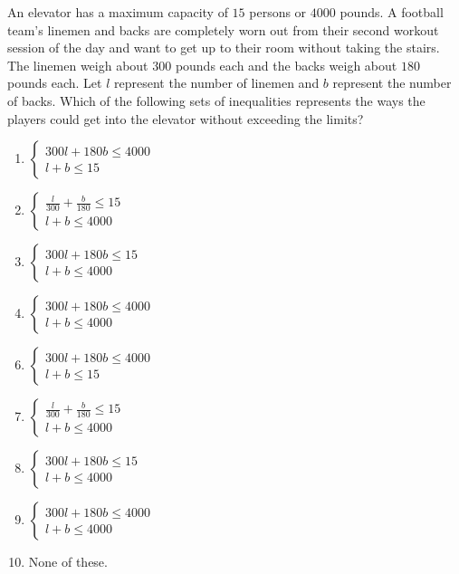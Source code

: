  
An elevator has a maximum capacity of $15$ persons or $4000$ pounds.  A football team's linemen and backs are completely worn out from their second workout session of the day and want to get up to their room without taking the stairs.  The linemen weigh about $300$ pounds each and the backs weigh about $180$ pounds each.  Let $l$ represent the number of linemen and $b$ represent the number of backs.  Which of the following sets of inequalities represents the ways the players could get into the elevator without exceeding the limits?


\ifsat
	\begin{enumerate}[label=\Alph*)]
		\item $\left\lbrace
 \begin{array}{l} 
 300l+180b\leq 4000\\ 
 l+b\leq 15 
 \end{array}
 \right.  $ %
		\item $\left\lbrace
 \begin{array}{l}
 \frac{l}{300}+\frac{b}{180}\leq 15\\
 l+b\leq 4000
 \end{array}\right. $ 
		\item $\left\lbrace
 \begin{array}{l}
 300l+180b\leq 15\\
 l+b\leq 4000
 \end{array}\right. $ 
		\item $\left\lbrace
 \begin{array}{l}
 300l+180b\leq 4000\\
 l+b\leq 4000
 \end{array}\right. $
	\end{enumerate}
\else
\fi

\ifacteven
	\begin{enumerate}[label=\textbf{\Alph*.},itemsep=\fill,align=left]
		\setcounter{enumii}{5}
		\item $\left\lbrace
 \begin{array}{l} 
 300l+180b\leq 4000\\ 
 l+b\leq 15 
 \end{array}
 \right.  $ %
		\item $\left\lbrace
 \begin{array}{l}
 \frac{l}{300}+\frac{b}{180}\leq 15\\
 l+b\leq 4000
 \end{array}\right. $ 
		\item $\left\lbrace
 \begin{array}{l}
 300l+180b\leq 15\\
 l+b\leq 4000
 \end{array}\right. $ 
		\addtocounter{enumii}{1}
		\item $\left\lbrace
 \begin{array}{l}
 300l+180b\leq 4000\\
 l+b\leq 4000
 \end{array}\right. $
		\item None of these. 
	\end{enumerate}
\else
\fi


